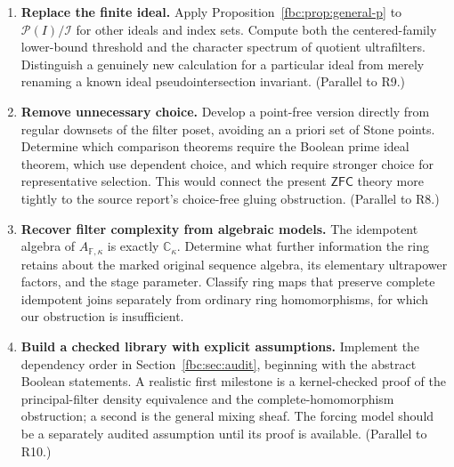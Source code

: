 \documentclass[11pt,letterpaper]{article}
\theoremstyle{definition}
\theoremstyle{remark}
\newcommand{\C}{\mathbb C}
\newcommand{\pow}{\mathcal P}
\newcommand{\Fd}{\mathbb F}
\newcommand{\ZFC}{\mathsf{ZFC}}
\begin{document}
\begin{enumerate}[label=\textbf{Q\arabic*.},leftmargin=3em]
\item \textbf{Replace the finite ideal.}
Apply Proposition~\ref{fbc:prop:general-p} to
$\pow(I)/\mathcal I$ for other ideals and index sets. Compute both
the centered-family lower-bound threshold and the character
spectrum of quotient ultrafilters. Distinguish a genuinely new
calculation for a particular ideal from merely renaming a known
ideal pseudointersection invariant. (Parallel to R9.)

\item \textbf{Remove unnecessary choice.}
Develop a point-free version directly from regular downsets of
the filter poset, avoiding an a priori set of Stone points.
Determine which comparison theorems require the Boolean prime
ideal theorem, which use dependent choice, and which require
stronger choice for representative selection. This would connect
the present $\ZFC$ theory more tightly to the source report's
choice-free gluing obstruction. (Parallel to R8.)

\item \textbf{Recover filter complexity from algebraic models.}
The idempotent algebra of $A_{\Fd,\kappa}$ is exactly
$\C_\kappa$. Determine what further information the ring retains
about the marked original sequence algebra, its elementary
ultrapower factors, and the stage parameter. Classify ring maps
that preserve complete idempotent joins separately from ordinary
ring homomorphisms, for which our obstruction is insufficient.

\item \textbf{Build a checked library with explicit assumptions.}
Implement the dependency order in Section~\ref{fbc:sec:audit},
beginning with the abstract Boolean statements. A realistic
first milestone is a kernel-checked proof of the principal-filter
density equivalence and the complete-homomorphism obstruction;
a second is the general mixing sheaf. The forcing model should
be a separately audited assumption until its proof is available.
(Parallel to R10.)
\end{enumerate}
\end{document}
